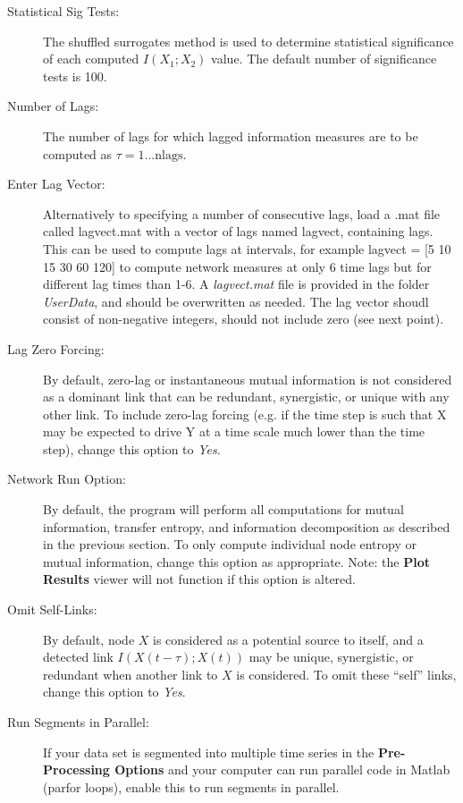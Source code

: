 \documentclass[a4paper]{article}
\begin{document}
\begin{description}
\item[Statistical Sig Tests:] The shuffled surrogates method is used to determine statistical significance of each computed $I(X_1;X_2)$ value.  The default number of significance tests is 100.
\item[Number of Lags:] The number of lags for which lagged information measures are to be computed as $\tau = 1...\text{nlags}$.
\item[Enter Lag Vector:] Alternatively to specifying a number of consecutive lags, load a .mat file called lagvect.mat with a vector of lags named lagvect, containing lags.  This can be used to compute lags at intervals, for example lagvect = [5 10 15 30 60 120] to compute network measures at only 6 time lags but for different lag times than 1-6.  A \textit{lagvect.mat} file is provided in the folder \textit{UserData}, and should be overwritten as needed.  The lag vector shoudl consist of non-negative integers, should not include zero (see next point).

\item[Lag Zero Forcing:]  By default, zero-lag or instantaneous mutual information is not considered as a dominant link that can be redundant, synergistic, or unique with any other link.  To include zero-lag forcing (e.g. if the time step is such that X may be expected to drive Y at a time scale much lower than the time step), change this option to \textit{Yes}.
\item[Network Run Option:] By default, the program will perform all computations for mutual information, transfer entropy, and information decomposition as described in the previous section.  To only compute individual node entropy or mutual information, change this option as appropriate.  Note: the \textbf{Plot Results} viewer will not function if this option is altered.
\item[Omit Self-Links:] By default, node $X$ is considered as a potential source to itself, and a detected link $I(X(t-\tau);X(t))$ may be unique, synergistic, or redundant when another link to $X$ is considered.  To omit these ``self'' links, change this option to \textit{Yes}.
\item[Run Segments in Parallel:] If your data set is segmented into multiple time series in the \textbf{Pre-Processing Options} and your computer can run parallel code in Matlab (parfor loops), enable this to run segments in parallel.
\end{description}
\end{document}
